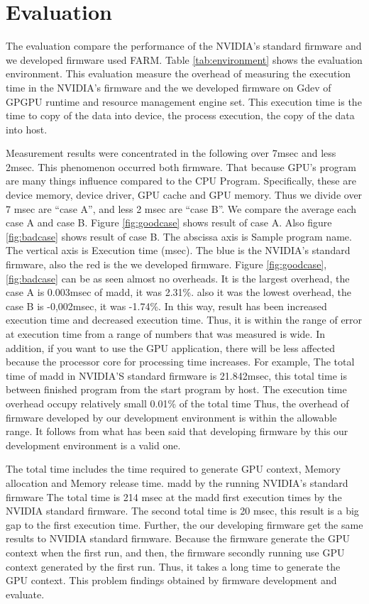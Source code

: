 

\section{Evaluation}\label{sec:evaluation}
The evaluation compare the performance of the NVIDIA's standard firmware and we developed firmware used FARM.
Table \ref{tab:environment} shows the evaluation environment.
This evaluation measure the overhead of measuring the execution time in the NVIDIA's firmware and the we developed firmware on Gdev\cite{kato:gdev}\cite{kato:gdev2} of GPGPU runtime and resource management engine set.
This execution time is the time to copy of the data into device, the process execution, 
the copy of the data into host.
\par
Measurement results were concentrated in the following over 7msec and less 2msec.
This phenomenon occurred both firmware.
That because GPU's program are many things influence compared to the CPU Program.
Specifically, these are device memory, device driver, GPU cache and GPU memory.
Thus we divide over 7 msec are ``case A'', and less 2 msec are ``case B''.
We compare the average each case A and case B.
Figure \ref{fig:goodcase} shows result of case A.
Also figure \ref{fig:badcase} shows result of case B.
The abscissa axis is Sample program name.
The vertical axis is Execution time (msec).
The blue is the NVIDIA's standard firmware, also the red is the we developed firmware.
Figure \ref{fig:goodcase}, \ref{fig:badcase} can be as seen almost no overheads. 
It is the largest overhead, the case A is 0.003msec of madd, it was 2.31\%.
also it was the lowest overhead, the case B is -0,002msec, it was -1.74\%.
In this way, result has been increased execution time and decreased execution time.
Thus, it is within the range of error at execution time from a range of numbers that was measured is wide.
In addition, if you want to use the GPU application, there will be less affected because the processor core for processing time increases.
For example, The total time of madd in NVIDIA'S standard firmware is 21.842msec, this total time is between finished program from the start program by host.
The execution time overhead occupy relatively small 0.01\% of the total time
Thus, the overhead of firmware developed by our development environment is within the allowable range.
It follows from what has been said that developing firmware by this our development environment is a valid one.
\par
The total time includes the time required to generate GPU context, Memory allocation and Memory release time. 
madd by the running NVIDIA's standard firmware
The total time is 214 msec at the madd first execution times by the NVIDIA standard firmware.
The second total time is 20 msec, this result is a big gap to the first execution time.
Further, the our developing firmware get the same results to NVIDIA standard firmware.
Because the firmware generate the GPU context when the first run, and then, the firmware secondly running use GPU context generated by the first run.
Thus, it takes a long time to generate the GPU context.
This problem findings obtained by firmware development and evaluate.

